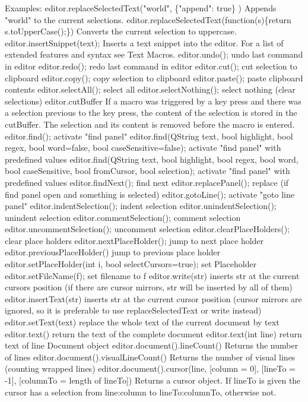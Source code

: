 \documentclass{article}
\begin{document}
	Examples:
	editor.replaceSelectedText("world", \{"append": true\} ) Appends "world" to the current selections.
	editor.replaceSelectedText(function(s)\{return s.toUpperCase();\}) Converts the current selection to uppercase.
	editor.insertSnippet(text);	Inserts a text snippet into the editor. For a list of extended features and syntax see Text Macros.
	editor.undo();	undo last command in editor
	editor.redo();	redo last command in editor
	editor.cut();	cut selection to clipboard
	editor.copy();	copy selection to clipboard
	editor.paste();	paste clipboard contents
	editor.selectAll();	select all
	editor.selectNothing();	select nothing (clear selections)
	editor.cutBuffer	If a macro was triggered by a key press and there was a selection previous to the key press, the content of the selection is stored in the cutBuffer. The selection and its content is removed before the macro is entered.
	editor.find();	activate "find panel"
	editor.find(QString text, bool highlight, bool regex, bool word=false, bool caseSensitive=false);	activate "find panel" with predefined values
	editor.find(QString text, bool highlight, bool regex, bool word, bool caseSensitive, bool fromCursor, bool selection);	activate "find panel" with predefined values
	editor.findNext();	find next
	editor.replacePanel();	replace (if find panel open and something is selected)
	editor.gotoLine();	activate "goto line panel"
	editor.indentSelection();	indent selection
	editor.unindentSelection();	unindent selection
	editor.commentSelection();	comment selection
	editor.uncommentSelection();	uncomment selection
	editor.clearPlaceHolders();	clear place holders
	editor.nextPlaceHolder();	jump to next place holder
	editor.previousPlaceHolder()	jump to previous place holder
	editor.setPlaceHolder(int i, bool selectCursors=true);	set Placeholder
	editor.setFileName(f);	set filename to f
	editor.write(str)	inserts str at the current cursors position (if there are cursor mirrors, str will be inserted by all of them)
	editor.insertText(str)	inserts str at the current cursor position (cursor mirrors are ignored, so it is preferable to use replaceSelectedText or write instead)
	editor.setText(text)	replace the whole text of the current document by text
	editor.text()	return the text of the complete document
	editor.text(int line)	return text of line
	Document object
	editor.document().lineCount()	Returns the number of lines
	editor.document().visualLineCount()	Returns the number of visual lines (counting wrapped lines)
	editor.document().cursor(line, [column = 0], [lineTo = -1], [columnTo = length of lineTo])	Returns a cursor object. If lineTo is given the cursor has a selection from line:column to lineTo:columnTo, otherwise not.
\end{document}
